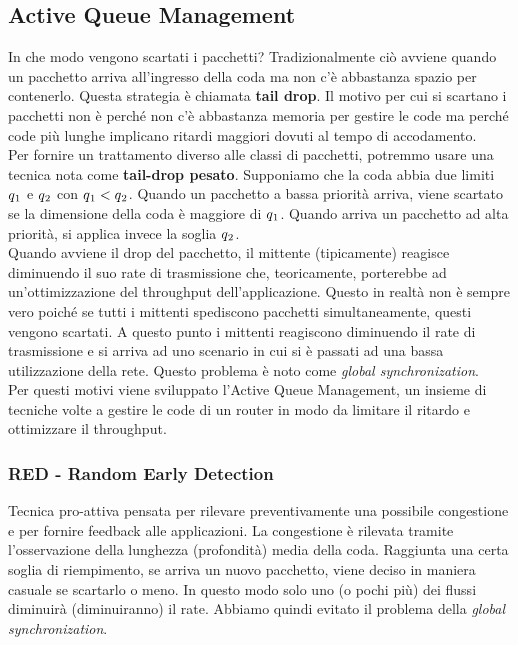 \documentclass{article}
\begin{document}
\subsection{Active Queue Management}
In che modo vengono scartati i pacchetti? Tradizionalmente ciò avviene quando un pacchetto arriva all'ingresso della coda ma non c'è abbastanza spazio per contenerlo. Questa strategia è chiamata \textbf{tail drop}. Il motivo per cui si scartano i pacchetti non è perché non c'è abbastanza memoria per gestire le code ma perché code più lunghe implicano ritardi maggiori dovuti al tempo di accodamento.\\
Per fornire un trattamento diverso alle classi di pacchetti, potremmo usare una tecnica nota come \textbf{tail-drop pesato}. Supponiamo che la coda abbia due limiti \(q\textsubscript{1}\) e \(q\textsubscript{2}\) con \(q\textsubscript{1} < q\textsubscript{2} \). Quando un pacchetto a bassa priorità arriva, viene scartato se la dimensione della coda è maggiore di \(q\textsubscript{1}\). Quando arriva un pacchetto ad alta priorità, si applica invece la soglia \(q\textsubscript{2}\).\\
Quando avviene il drop del pacchetto, il mittente (tipicamente) reagisce diminuendo il suo rate di trasmissione che, teoricamente, porterebbe ad un'ottimizzazione del throughput dell'applicazione. Questo in realtà non è sempre vero poiché se tutti i mittenti spediscono pacchetti simultaneamente, questi vengono scartati. A questo punto i mittenti reagiscono diminuendo il rate di trasmissione e si arriva ad uno scenario in cui si è passati ad una bassa utilizzazione della rete. Questo problema è noto come \textit{global synchronization}.\\
Per questi motivi viene sviluppato l'Active Queue Management, un insieme di tecniche volte a gestire le code di un router in modo da limitare il ritardo e ottimizzare il throughput.\\

\subsubsection{RED - Random Early Detection}
Tecnica pro-attiva pensata per rilevare preventivamente una possibile congestione e per fornire feedback alle applicazioni. La congestione è rilevata tramite l'osservazione della lunghezza (profondità) media della coda. Raggiunta una certa soglia di riempimento, se arriva un nuovo pacchetto, viene deciso in maniera casuale se scartarlo o meno. In questo modo solo uno (o pochi più) dei flussi diminuirà (diminuiranno) il rate. Abbiamo quindi evitato il problema della \textit{global synchronization}.
\end{document}
